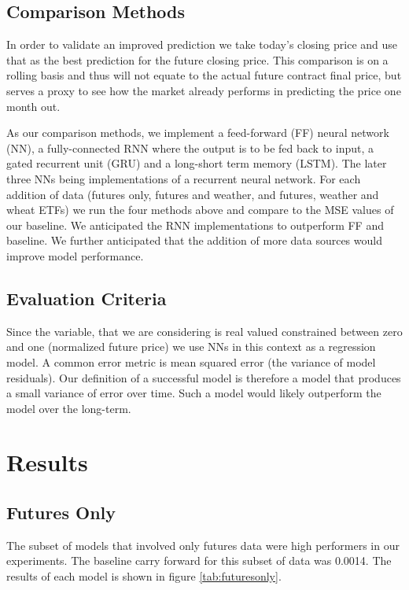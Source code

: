 \documentclass[twoside,11pt]{article}
\begin{document}
\subsection{Comparison Methods}

In order to validate an improved prediction we take today's closing price and use that as the best prediction for the future closing price. This comparison is on a rolling basis and thus will not equate to the actual future contract final price, but serves a proxy to see how the market already performs  in predicting the price one month out. 

As our comparison methods, we implement a feed-forward (FF) neural network (NN), a fully-connected RNN where the output is to be fed back to input, a gated recurrent unit (GRU) and a long-short term memory (LSTM). The later three NNs being implementations of a recurrent neural network. For each addition of data (futures only, futures and weather, and futures, weather and wheat ETFs) we run the four methods above and compare to the MSE values of our baseline. We anticipated the RNN implementations to outperform FF and baseline. We further anticipated that the addition of more data sources would improve model performance. 

\subsection{Evaluation Criteria}

Since the variable, that we are considering is real valued constrained between zero and one (normalized future price) we use NNs in this context as a regression model. A common error metric is mean squared error (the variance of model residuals). Our definition of a successful model is therefore a model that produces a small variance of error over time. Such a model would likely outperform the model over the long-term. 

\section{Results} \label{results}

\subsection{Futures Only}

The subset of models that involved only futures data were high performers in our experiments. The baseline carry forward for this subset of data was 0.0014. The results of each model is shown in figure \ref{tab:futuresonly}.
\end{document}
